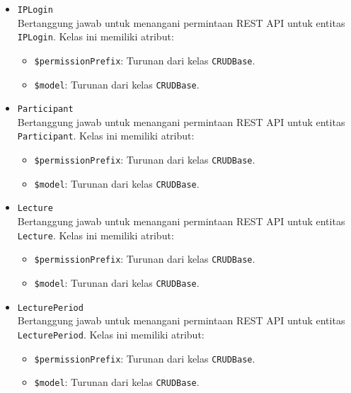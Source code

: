 \begin{itemize}
        \item \texttt{IPLogin}\\
            Bertanggung jawab untuk menangani permintaan REST API untuk entitas \texttt{IPLogin}. 
            Kelas ini memiliki atribut:
            \begin{itemize}
                \item \texttt{\$permissionPrefix}: Turunan dari kelas \texttt{CRUDBase}.
                \item \texttt{\$model}: Turunan dari kelas \texttt{CRUDBase}.
            \end{itemize}
        
        \item \texttt{Participant}\\
            Bertanggung jawab untuk menangani permintaan REST API untuk entitas 
            \texttt{Participant}. 
            Kelas ini memiliki atribut:
            \begin{itemize}
                \item \texttt{\$permissionPrefix}: Turunan dari kelas \texttt{CRUDBase}.
                \item \texttt{\$model}: Turunan dari kelas \texttt{CRUDBase}.
            \end{itemize}
        
        \item \texttt{Lecture}\\
            Bertanggung jawab untuk menangani permintaan REST API untuk entitas \texttt{Lecture}. 
            Kelas ini memiliki atribut:
            \begin{itemize}
                \item \texttt{\$permissionPrefix}: Turunan dari kelas \texttt{CRUDBase}.
                \item \texttt{\$model}: Turunan dari kelas \texttt{CRUDBase}.
            \end{itemize}
        
        \item \texttt{LecturePeriod}\\
            Bertanggung jawab untuk menangani permintaan REST API untuk entitas 
            \texttt{LecturePeriod}. 
            Kelas ini memiliki atribut:
            \begin{itemize}
                \item \texttt{\$permissionPrefix}: Turunan dari kelas \texttt{CRUDBase}.
                \item \texttt{\$model}: Turunan dari kelas \texttt{CRUDBase}.
            \end{itemize}
        

\end{itemize}
